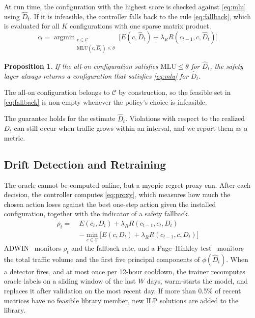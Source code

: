 \documentclass[journal]{IEEEtran}
\newtheorem{proposition}{Proposition}
\begin{document}
At run time, the configuration with the highest score is checked against \eqref{eq:mlu} using $\hat{D}_t$. If it is infeasible, the controller falls back to the rule \eqref{eq:fallback}, which is evaluated for all $K$ configurations with one sparse matrix product.
\begin{equation}\label{eq:fallback}
c_t=\mathop{\arg\min}_{\substack{c\in\mathcal{C}\\\mathrm{MLU}(c,\hat{D}_t)\le\theta}}\Big[E(c,\hat{D}_t)+\lambda_R R(c_{t-1},c,\hat{D}_t)\Big]
\end{equation}
\begin{proposition}\label{prop:safety}
If the all-on configuration satisfies $\mathrm{MLU}\le\theta$ for $\hat{D}_t$, the safety layer always returns a configuration that satisfies \eqref{eq:mlu} for $\hat{D}_t$.
\end{proposition}
\begin{IEEEproof}
The all-on configuration belongs to $\mathcal{C}$ by construction, so the feasible set in \eqref{eq:fallback} is non-empty whenever the policy's choice is infeasible.
\end{IEEEproof}
The guarantee holds for the estimate $\hat{D}_t$. Violations with respect to the realized $D_t$ can still occur when traffic grows within an interval, and we report them as a metric.

\subsection{Drift Detection and Retraining}\label{sec:drift}

The oracle cannot be computed online, but a myopic regret proxy can. After each decision, the controller computes \eqref{eq:proxy}, which measures how much the chosen action loses against the best one-step action given the installed configuration, together with the indicator of a safety fallback.
\begin{equation}\label{eq:proxy}
\begin{split}\rho_t=\;&E(c_t,D_t)+\lambda_R R(c_{t-1},c_t,D_t)\\
&-\min_{c\in\mathcal{C}}\Big[E(c,D_t)+\lambda_R R(c_{t-1},c,D_t)\Big]\end{split}
\end{equation}
ADWIN~\cite{bifet2007adwin} monitors $\rho_t$ and the fallback rate, and a Page--Hinkley test~\cite{page1954cusum} monitors the total traffic volume and the first five principal components of $\phi(\hat{D}_t)$. When a detector fires, and at most once per 12-hour cooldown, the trainer recomputes oracle labels on a sliding window of the last $W$ days, warm-starts the model, and replaces it after validation on the most recent day. If more than 0.5\% of recent matrices have no feasible library member, new ILP solutions are added to the library.
\end{document}
